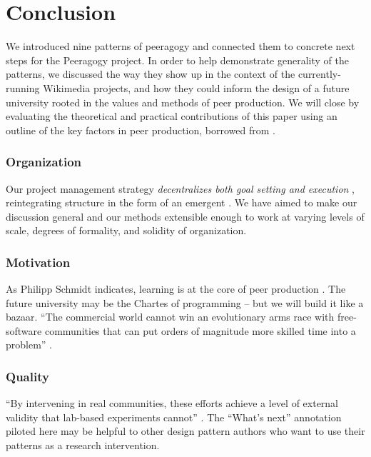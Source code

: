 \section{Conclusion}\label{sec:Conclusion}

We introduced nine patterns of peeragogy and connected them to
concrete next steps for the Peeragogy project.  In order to help
demonstrate generality of the patterns, we discussed the way they show
up in the context of the currently-running Wikimedia projects, and how
they could inform the design of a future university rooted in the
values and methods of peer production.
We will close by evaluating the theoretical and practical
contributions of this paper using an outline of the key factors in
peer production, borrowed from \cite{benkler2015peer}.

\vspace{-.25\baselineskip}

\subsubsection*{Organization} 
Our project management strategy \emph{decentralizes both goal setting
  and execution} \cite{benkler2015peer}, reintegrating structure in
the form of an emergent .  We have aimed to make
our discussion general and our methods extensible enough to work at
varying levels of scale, degrees of formality, and solidity of
organization.

\vspace{-.25\baselineskip}

\subsubsection*{Motivation}  As Philipp Schmidt indicates, learning
is at the core of peer production \cite{schmidt+commons-based+2009}.
The future university may be the Chartes of programming -- but we will
build it like a bazaar. ``The commercial world cannot win an
evolutionary arms race with free-software communities that can put
orders of magnitude more skilled time into a problem''
\cite{raymond2001cathedral}.

\vspace{-.25\baselineskip}

\subsubsection*{Quality} 
``By intervening in real communities, these efforts achieve a level of
external validity that lab-based experiments cannot''
\cite{benkler2015peer}.  The ``What's next'' annotation piloted here
may be helpful to other design pattern authors who want to use their
patterns as a research intervention.

